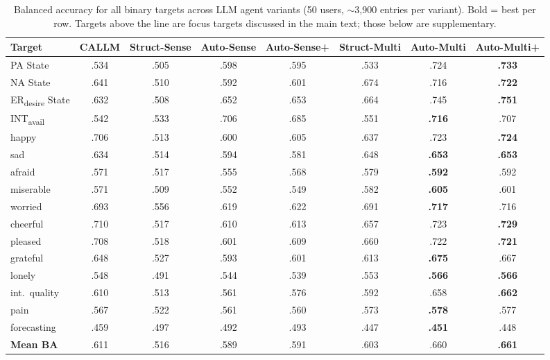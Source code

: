 \documentclass[screen,review,anonymous]{acmart}
\newcommand{\erdesire}{ER\textsubscript{desire}}
\newcommand{\intavail}{INT\textsubscript{avail}}
\begin{document}
\begin{table}[t]
\caption{Balanced accuracy for all binary targets across LLM agent variants (50 users, ${\sim}$3,900 entries per variant). Bold = best per row. Targets above the line are focus targets discussed in the main text; those below are supplementary.}
\label{tab:full_ba}
\small
\begin{tabular}{l ccccccc}
\toprule
\textbf{Target} & \textbf{CALLM} & \textbf{Struct-Sense} & \textbf{Auto-Sense} & \textbf{Auto-Sense+} & \textbf{Struct-Multi} & \textbf{Auto-Multi} & \textbf{Auto-Multi+} \\
\midrule
PA State & .534 & .505 & .598 & .595 & .533 & .724 & \textbf{.733} \\
NA State & .641 & .510 & .592 & .601 & .674 & .716 & \textbf{.722} \\
\erdesire{} State & .632 & .508 & .652 & .653 & .664 & .745 & \textbf{.751} \\
\intavail{} & .542 & .533 & .706 & .685 & .551 & \textbf{.716} & .707 \\
\midrule
happy & .706 & .513 & .600 & .605 & .637 & .723 & \textbf{.724} \\
sad & .634 & .514 & .594 & .581 & .648 & \textbf{.653} & \textbf{.653} \\
afraid & .571 & .517 & .555 & .568 & .579 & \textbf{.592} & .592 \\
miserable & .571 & .509 & .552 & .549 & .582 & \textbf{.605} & .601 \\
worried & .693 & .556 & .619 & .622 & .691 & \textbf{.717} & .716 \\
cheerful & .710 & .517 & .610 & .613 & .657 & .723 & \textbf{.729} \\
pleased & .708 & .518 & .601 & .609 & .660 & .722 & \textbf{.721} \\
grateful & .648 & .527 & .593 & .601 & .613 & \textbf{.675} & .667 \\
lonely & .548 & .491 & .544 & .539 & .553 & \textbf{.566} & \textbf{.566} \\
int.~quality & .610 & .513 & .561 & .576 & .592 & .658 & \textbf{.662} \\
pain & .567 & .522 & .561 & .560 & .573 & \textbf{.578} & .577 \\
forecasting & .459 & .497 & .492 & .493 & .447 & \textbf{.451} & .448 \\
\midrule
\textbf{Mean BA} & .611 & .516 & .589 & .591 & .603 & .660 & \textbf{.661} \\
\bottomrule
\end{tabular}
\end{table}
\end{document}
